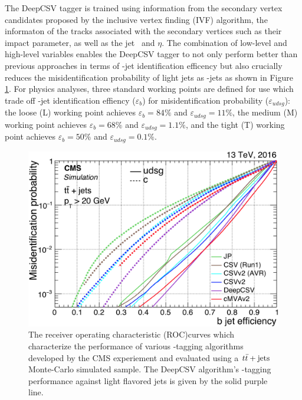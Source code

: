 The DeepCSV tagger is trained using information from the secondary vertex candidates proposed by the inclusive vertex finding (IVF) algorithm, the informaton of the tracks associated with the secondary vertices such as their impact parameter, as well as the jet \pT\ and $\eta$. The combination of low-level and high-level variables enables the DeepCSV tagger to not only perform better than previous approaches in terms of \qrkb-jet identification efficency but also crucially reduces the misidentification probability of light jets as \qrkb-jets as shown in Figure \ref{fig:btagperf}. For physics analyses, three standard working points are defined for use which trade off \qrkb-jet identification effiency ($\varepsilon_{b}$) for misidentification probability ($\varepsilon_{udsg}$): the loose (L) working point achieves $\varepsilon_{b} = 84\%$ and $\varepsilon_{udsg} = 11\%$, the medium (M) working point achieves $\varepsilon_{b} = 68\%$ and $\varepsilon_{udsg} = 1.1\%$, and the tight (T) working point achieves $\varepsilon_{b} = 50\%$ and $\varepsilon_{udsg} = 0.1\%$.

\begin{figure}[htbp]
  \centering
    \includegraphics[width=4.5in]{images/btagperf}
    \caption[CMS \qrkb-Tagging Performance]{The receiver operating characteristic (ROC)curves which characterize the performance of various \qrkb-tagging algorithms developed by the CMS experiement and evaluated using a $t\bar{t}+\mathrm{jets}$ Monte-Carlo simulated sample. The DeepCSV algorithm's \qrkb-tagging performance against light flavored jets is given by the solid purple line.\cite{CMSBTAG}}
    \label{fig:btagperf}
\end{figure}

